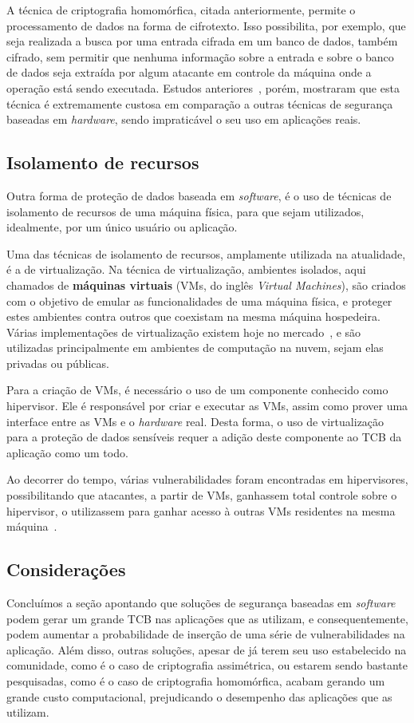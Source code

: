 A técnica de criptografia homomórfica, citada anteriormente, permite o
processamento de dados na forma de cifrotexto. Isso possibilita, por exemplo,
que seja realizada a busca por uma entrada cifrada em um banco de dados, também
cifrado, sem permitir que nenhuma informação sobre a entrada e sobre o banco de
dados seja extraída por algum atacante em controle da máquina onde a operação
está sendo executada. Estudos anteriores~\cite{sac2017}, porém, mostraram que
esta técnica é extremamente custosa em comparação a outras técnicas de segurança
baseadas em \textit{hardware}, sendo impraticável o seu uso em aplicações reais.

\subsection{Isolamento de recursos}
\label{subsec:estadoarte_segsoft_isolamento_recursos}

Outra forma de proteção de dados baseada em \textit{software}, é o uso de
técnicas de isolamento de recursos de uma máquina física, para que sejam
utilizados, idealmente, por um único usuário ou aplicação.

Uma das técnicas de isolamento de recursos, amplamente utilizada na atualidade,
é a de virtualização. Na técnica de virtualização, ambientes isolados, aqui
chamados de \textbf{máquinas virtuais} (VMs, do inglês \textit{Virtual
Machines}), são criados com o objetivo de emular as funcionalidades de uma
máquina física, e proteger estes ambientes contra outros que coexistam na mesma
máquina hospedeira. Várias implementações de virtualização existem hoje no
mercado~\cite{qemu,xen,kvm,vmware}, e são utilizadas principalmente em
ambientes de computação na nuvem, sejam elas privadas ou públicas.

Para a criação de VMs, é necessário o uso de um componente conhecido como
hipervisor. Ele é responsável por criar e executar as VMs, assim como prover
uma interface entre as VMs e o \textit{hardware} real. Desta forma, o uso de
virtualização para a proteção de dados sensíveis requer a adição deste
componente ao TCB da aplicação como um todo.

Ao decorrer do tempo, várias vulnerabilidades foram encontradas em hipervisores,
possibilitando que atacantes, a partir de VMs, ganhassem total controle sobre o
hipervisor, o utilizassem para ganhar acesso à outras VMs residentes na mesma
máquina~\cite{kortchinsky2009cloudburst}.

\subsection{Considerações}
Concluímos a seção apontando que soluções de segurança baseadas em \textit
{software} podem gerar um grande TCB nas aplicações que as utilizam, e
consequentemente, podem aumentar a probabilidade de inserção de uma série de
vulnerabilidades na aplicação. Além disso, outras soluções, apesar de já terem
seu uso estabelecido na comunidade, como é o caso de criptografia assimétrica,
ou estarem sendo bastante pesquisadas, como é o caso de criptografia
homomórfica, acabam gerando um grande custo computacional, prejudicando o
desempenho das aplicações que as utilizam.

